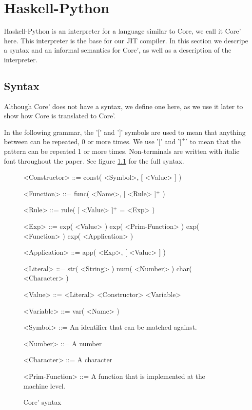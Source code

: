 
\chapter{Haskell-Python}
\label{chap:hs}

Haskell-Python\cite{haskellpython}
is an interpreter for a language similar to Core, we call it Core' here.
This interpreter is the base for our JIT compiler. In this section we descripe a 
syntax and an informal semantics for Core', as well as a description of the 
interpreter.


\section{Syntax}
\label{sec:syntax}

Although Core' does not have a syntax, we define one here, as we use it later 
to show how Core is translated to Core'.

In the following grammar, the '[' and ']' symbols are used to mean that
anything between can be repeated, 0 or more times. We use '[' and '$]^+$' to 
mean that the pattern can be repeated 1 or more times. Non-terminals are 
written with italic font throughout the paper.
See figure \ref{gr:coresyn} for the full syntax.

\begin{figure}[H]
\centering
\scriptsize
\begin{grammar}
<Constructor> ::= const( <Symbol>, [ <Value> ] )

<Function> ::= func( <Name>, [ <Rule> ]$^+$ )

<Rule> ::= rule( [ <Value> ]$^+$ = <Exp> )

<Exp> ::= exp( <Value> )
     \alt exp( <Prim-Function> )
     \alt exp( <Function> )
     \alt exp( <Application> )

<Application> ::= app( <Exp>, [ <Value> ] )

<Literal> ::= str( <String> )
	 \alt num( <Number> )
	 \alt char( <Character> )

<Value> ::= <Literal>
       \alt <Constructor>
       \alt <Variable>

<Variable> ::= var( <Name> )

<Symbol> ::= An identifier that can be matched against.

<Number> ::= A number

<Character> ::= A character

<Prim-Function> ::= A function that is implemented at the machine level.

\end{grammar}

\caption{Core' syntax}
\label{gr:coresyn}

\end{figure}


